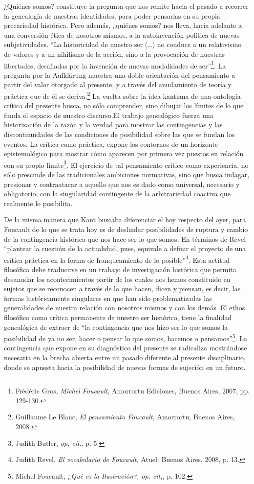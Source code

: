 ¿Quiénes somos? constituye la pregunta que nos remite hacia el pasado a recorrer la genealogía de nuestras identidades, para poder pensarlas en su propia precariedad histórica. Pero además, ¿quiénes somos? nos lleva, hacia adelante a una conversión ética de nosotros mismos, a la autoinvención política de nuevas subjetividades. \enquote{La historicidad de nuestro ser (\dots) no conduce a un relativismo de valores y a un nihilismo de la acción, sino a la provocación de nuestras libertades, desafiadas por la invención de nuevas modalidades de ser}\footnote{Frédéric Gros, \emph{Michel Foucault,} Amorrortu Ediciones, Buenos Aires, 2007, pp. 129-130.}. La pregunta por la Aufklärung muestra una doble orientación del pensamiento a partir del valor otorgado al presente, y a través del anudamiento de teoría y práctica que de él se deriva.\footnote{Guillaume Le Blanc, \emph{El pensamiento Foucault,} Amorrortu, Buenos Aires, 2008.} La vuelta sobre la idea kantiana de una ontología crítica del presente busca, no sólo comprender, sino dibujar los límites de lo que funda el espacio de nuestro discurso.El trabajo genealógico fuerza una historización de la razón y la verdad para mostrar las contingencias y las discontinuidades de las condiciones de posibilidad sobre las que se fundan los eventos. La crítica como práctica, expone los contornos de un horizonte epistemológico para mostrar cómo aparecen por primera vez puestos en relación con su propio límite\footnote{Judith Butler, \emph{op, cit}., p. 5.}. El ejercicio de tal pensamiento crítico como experiencia, no sólo prescinde de las tradicionales ambiciones normativas, sino que busca indagar, presionar y contraatacar a aquello que nos es dado como universal, necesario y obligatorio, con la singularidad contingente de la arbitrariedad coactiva que realmente lo posibilita.

De la misma manera que Kant buscaba diferenciar el hoy respecto del ayer, para Foucault de lo que se trata hoy es de deslindar posibilidades de ruptura y cambio de la contingencia histórica que nos hace ser lo que somos. En términos de Revel \enquote{plantear la cuestión de la actualidad, pues, equivale a definir el proyecto de una crítica práctica en la forma de franqueamiento de lo posible}\footnote{Judith Revel, \emph{El vocabulario de Foucault,} Atuel: Buenos Aires, 2008, p. 13.}. Esta actitud filosófica debe traducirse en un trabajo de investigación histórica que permita desanudar los acontecimientos partir de los cuales nos hemos constituido en sujetos que se reconocen a través de lo que hacen, dicen y piensan, es decir, las formas históricamente singulares en que han sido problematizadas las generalidades de nuestra relación con nosotros mismos y con los demás. El ethos filosófico como crítica permanente de nuestro ser histórico, tiene la finalidad genealógica de extraer de \enquote{la contingencia que nos hizo ser lo que somos la posibilidad de ya no ser, hacer o pensar lo que somos, hacemos o pensamos}\footnote{Michel Foucault, ¿\emph{Qué es la Ilustración?, op. cit,,} p. 102.}. La contingencia que expone en su diagnóstico del presente se radicaliza mostrándose necesaria en la brecha abierta entre un pasado diferente al presente disciplinario, donde se apuesta hacia la posibilidad de nuevas formas de sujeción en un futuro.


